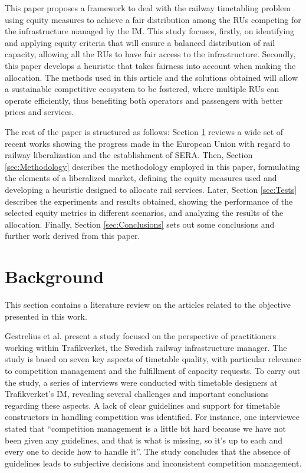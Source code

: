 \documentclass[preprint,12pt]{elsarticle}
\begin{document}
This paper proposes a framework to deal with the railway timetabling problem using equity measures to achieve a fair distribution among the \glspl{RU} competing for the infrastructure managed by the \gls{IM}. This study focuses, firstly, on identifying and applying equity criteria that will ensure a balanced distribution of rail capacity, allowing all the \glspl{RU} to have fair access to the infrastructure. Secondly, this paper develops a heuristic that takes fairness into account when making the allocation. The methods used in this article and the solutions obtained will allow a sustainable competitive ecosystem to be fostered, where multiple \glspl{RU} can operate efficiently, thus benefiting both operators and passengers with better prices and services.

The rest of the paper is structured as follows: Section \ref{sec:background} reviews a wide set of recent works showing the progress made in the European Union with regard to railway liberalization and the establishment of \gls{SERA}. Then, Section \ref{sec:Methodology} describes the methodology employed in this paper, formulating the elements of a liberalized market, defining the equity measures used and developing a heuristic designed to allocate rail services. Later, Section \ref{sec:Tests} describes the experiments and results obtained, showing the performance of the selected equity metrics in different scenarios, and analyzing the results of the allocation. Finally, Section \ref{sec:Conclusions} sets out some conclusions and further work derived from this paper.

\section{Background}\label{sec:background}

This section contains a literature review on the articles related to the objective presented in this work.

Gestrelius et al. \cite{Gestrelius2020} present a study focused on the perspective of practitioners working within Trafikverket, the Swedish railway infrastructure manager.  The study is based on seven key aspects of timetable quality, with particular relevance to competition management and the fulfillment of capacity requests. To carry out the study, a series of interviews were conducted with timetable designers at Trafikverket’s \gls{IM}, revealing several challenges and important conclusions regarding these aspects. A lack of clear guidelines and support for timetable constructors in handling competition was identified. For instance, one interviewee stated that ``competition management is a little bit hard because we have not been given any guidelines, and that is what is missing, so it’s up to each and every one to decide how to handle it''. The study concludes that the absence of guidelines leads to subjective decisions and inconsistent competition management. 
\end{document}
